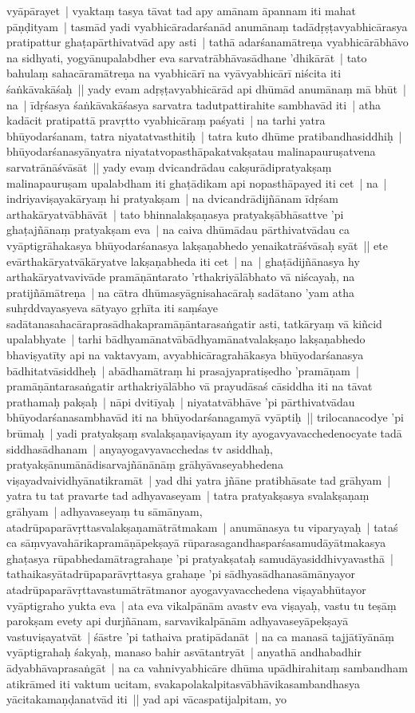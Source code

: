 \documentclass[article,12pt,a4paper]{memoir}%
\newcommand{\persName}[1]{#1}
\begin{document}
vyāpārayet | vyaktaṃ tasya tāvat tad apy amānam āpannam iti mahat pāṇḍityam | tasmād yadi vyabhicāradarśanād anumānaṃ tadādṛṣṭavyabhicārasya pratipattur ghaṭapārthivatvād apy asti | tathā adarśanamātreṇa vyabhicārābhāvo na sidhyati, yogyānupalabdher eva sarvatrābhāvasādhane 'dhikārāt | tato bahulaṃ sahacāramātreṇa na vyabhicārī na vyāvyabhicārī niścita iti śaṅkāvakāśaḥ || \label{thakur75-108.25} yady evam adṛṣṭavyabhicārād api dhūmād anumānaṃ mā bhūt | na | īdṛśasya śaṅkāvakāśasya sarvatra tadutpattirahite sambhavād iti | atha kadācit pratipattā pravṛtto vyabhicāraṃ paśyati | na tarhi yatra bhūyodarśanam, tatra niyatatvasthitiḥ | tatra kuto dhūme pratibandhasiddhiḥ | bhūyodarśanasyānyatra niyatatvopasthāpakatvakṣatau malinapauruṣatvena sarvatrānāśvāsāt || \label{thakur75-108.30} yady evaṃ dvicandrādau cakṣurādipratyakṣaṃ malinapauruṣam upalabdham iti ghaṭādikam api nopasthāpayed iti cet | na | indriyaviṣayakāryaṃ hi pratyakṣam | na dvicandrādijñānam īdṛśam arthakāryatvābhāvāt | tato bhinnalakṣaṇasya pratyakṣābhāsattve 'pi ghaṭajñānaṃ pratyakṣam eva | na caiva dhūmādau pārthivatvādau ca vyāptigrāhakasya bhūyodarśanasya lakṣaṇabhedo yenaikatrāśvāsaḥ syāt || \label{thakur75-109.4} ete evārthakāryatvākāryatve lakṣaṇabheda iti cet | na | ghaṭādijñānasya hy arthakāryatvavivāde pramāṇāntarato 'rthakriyālābhato vā niścayaḥ, na pratijñāmātreṇa | na cātra dhūmasyāgnisahacāraḥ sadātano 'yam atha suhṛddvayasyeva sātyayo gṛhīta iti saṃśaye sadātanasahacāraprasādhakapramāṇāntarasaṅgatir asti, tatkāryaṃ vā kiñcid upalabhyate | tarhi bādhyamānatvābādhyamānatvalakṣaṇo lakṣaṇabhedo bhaviṣyatīty api na vaktavyam, avyabhicāragrahākasya bhūyodarśanasya bādhitatvāsiddheḥ | abādhamātraṃ hi prasajyapratiṣedho 'pramāṇam | pramāṇāntarasaṅgatir arthakriyālābho vā prayudāsaś cāsiddha iti na tāvat prathamaḥ pakṣaḥ | nāpi dvitīyaḥ | niyatatvābhāve 'pi pārthivatvādau bhūyodarśanasambhavād iti na bhūyodarśanagamyā vyāptiḥ || \label{thakur75-109.13} \persName{trilocana}codye 'pi brūmaḥ | yadi pratyakṣaṃ svalakṣaṇaviṣayam ity ayogavyavacchedenocyate tadā siddhasādhanam | anyayogavyavacchedas tv asiddhaḥ, pratyakṣānumānādisarvajñānānāṃ grāhyāvaseyabhedena viṣayadvaividhyānatikramāt | yad dhi yatra jñāne pratibhāsate tad grāhyam | yatra tu tat pravarte tad adhyavaseyam | tatra pratyakṣasya svalakṣaṇaṃ grāhyam | adhyavaseyaṃ tu sāmānyam, atadrūpaparāvṛttasvalakṣaṇamātrātmakam | anumānasya tu viparyayaḥ | tataś ca sāṃvyavahārikapramāṇāpekṣayā rūparasagandhasparśasamudāyātmakasya ghaṭasya rūpabhedamātragrahaṇe 'pi pratyakṣataḥ samudāyasiddhivyavasthā | tathaikasyātadrūpaparāvṛttasya grahaṇe 'pi sādhyasādhanasāmānyayor atadrūpaparāvṛttavastumātrātmanor ayogavyavacchedena viṣayabhūtayor vyāptigraho yukta eva | ata eva vikalpānām avastv eva viṣayaḥ, vastu tu teṣāṃ parokṣam evety api durjñānam, sarvavikalpānām adhyavaseyāpekṣayā vastuviṣayatvāt | śāstre 'pi tathaiva pratipādanāt | na ca manasā tajjātīyānāṃ vyāptigrahaḥ śakyaḥ, manaso bahir asvātantryāt | anyathā andhabadhir ādyabhāvaprasaṅgāt | na ca vahnivyabhicāre dhūma upādhirahitaṃ sambandham atikrāmed iti vaktum ucitam, svakapolakalpitasvābhāvikasambandhasya yācitakamaṇḍanatvād iti || \label{thakur75-109.27} yad api vācaspatijalpitam, yo 
\end{document}
